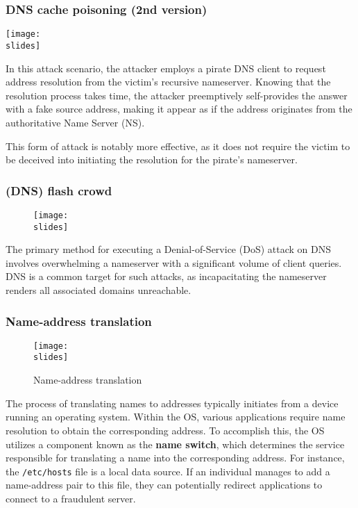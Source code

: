 \subsubsection{DNS cache poisoning (2nd version)}
\noindent
\begin{minipage}{0.4\textwidth}
    \centering
    \texttt{[image: \\slides]}
\end{minipage}
\hspace{0.05\textwidth}
\begin{minipage}{0.5\textwidth}
    In this attack scenario, the attacker employs a pirate DNS client to request address resolution from the victim's recursive nameserver. Knowing that the resolution process takes time, the attacker preemptively self-provides the answer with a fake source address, making it appear as if the address originates from the authoritative Name Server (NS).

    This form of attack is notably more effective, as it does not require the victim to be deceived into initiating the resolution for the pirate's nameserver.
\end{minipage}



\subsubsection{(DNS) flash crowd}
\begin{figure}[h]
    \centering
    \texttt{[image: \\slides]}
\end{figure}

The primary method for executing a Denial-of-Service (DoS) attack on DNS involves overwhelming a nameserver with a significant volume of client queries. DNS is a common target for such attacks, as incapacitating the nameserver renders all associated domains unreachable.

\subsubsection{Name-address translation}
\begin{figure}[h]
    \centering
    \texttt{[image: \\slides]}
    \caption{Name-address translation}
\end{figure}
The process of translating names to addresses typically initiates from a device running an operating system. Within the OS, various applications require name resolution to obtain the corresponding address. To accomplish this, the OS utilizes a component known as the \textbf{name switch}, which determines the service responsible for translating a name into the corresponding address. For instance, the \texttt{/etc/hosts} file is a local data source. If an individual manages to add a name-address pair to this file, they can potentially redirect applications to connect to a fraudulent server.

